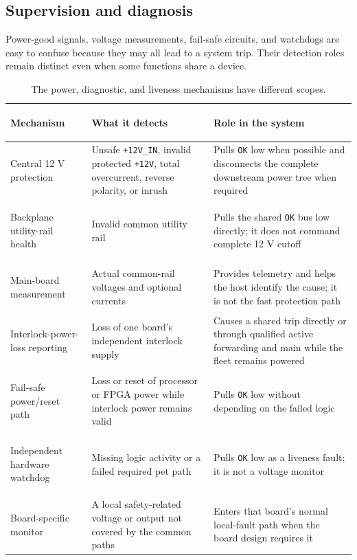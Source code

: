 \subsection{Supervision and diagnosis}

Power-good signals, voltage measurements, fail-safe circuits, and watchdogs are easy to confuse because they may all lead to a system trip. Their detection roles remain distinct even when some functions share a device.

\begin{table}[htbp]
\centering
\small
\begin{tabularx}{\textwidth}{@{}>{\bfseries\raggedright\arraybackslash}p{}>{\raggedright\arraybackslash}p{}>{\raggedright\arraybackslash}X@{}}
\toprule
Mechanism & What it detects & Role in the system \\
\midrule
Central 12 V protection & Unsafe \texttt{+12V\_IN}, invalid protected \texttt{+12V}, total overcurrent, reverse polarity, or inrush & Pulls \texttt{OK} low when possible and disconnects the complete downstream power tree when required \\
Backplane utility-rail health & Invalid common utility rail & Pulls the shared \texttt{OK} bus low directly; it does not command complete 12 V cutoff \\
Main-board measurement & Actual common-rail voltages and optional currents & Provides telemetry and helps the host identify the cause; it is not the fast protection path \\
Interlock-power-loss reporting & Loss of one board's independent interlock supply & Causes a shared trip directly or through qualified active forwarding and main while the fleet remains powered \\
Fail-safe power/reset path & Loss or reset of processor or FPGA power while interlock power remains valid & Pulls \texttt{OK} low without depending on the failed logic \\
Independent hardware watchdog & Missing logic activity or a failed required pet path & Pulls \texttt{OK} low as a liveness fault; it is not a voltage monitor \\
Board-specific monitor & A local safety-related voltage or output not covered by the common paths & Enters that board's normal local-fault path when the board design requires it \\
\bottomrule
\end{tabularx}
\caption{The power, diagnostic, and liveness mechanisms have different scopes.}
\label{tab:power-supervision-roles}
\end{table}

